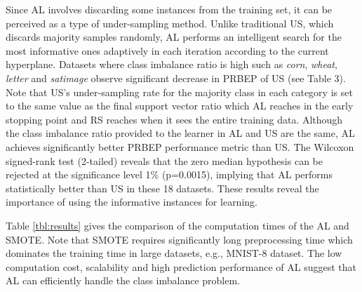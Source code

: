 Since AL involves discarding some instances from the training set, it can be perceived as a type of under-sampling method. Unlike traditional US, which discards majority samples randomly, AL performs an intelligent search for the most informative ones adaptively in each iteration according to the current hyperplane. Datasets where class imbalance ratio is high such as \emph{corn}, \emph{wheat}, \emph{letter} and \emph{satimage} observe significant decrease in PRBEP of US (see Table 3). Note that US's under-sampling rate for the majority class in each category is set to the same value as the final support vector ratio which AL reaches in the early stopping point and RS reaches when it sees the entire training data. Although the class imbalance ratio provided to the learner in AL and US are the same, AL achieves significantly better PRBEP performance metric than US. The Wilcoxon signed-rank test (2-tailed) reveals that the zero median hypothesis can be rejected at the significance level 1\% (p=0.0015), implying that AL performs statistically better than US in these 18 datasets. These results reveal the importance of using the informative instances for learning.


Table \ref{tbl:results} gives the comparison of the computation times of the AL and SMOTE. Note that SMOTE requires significantly long preprocessing time which dominates the training time in large datasets, e.g., MNIST-8 dataset. The low computation cost, scalability and high prediction performance of AL suggest that AL can efficiently handle the class imbalance problem.
